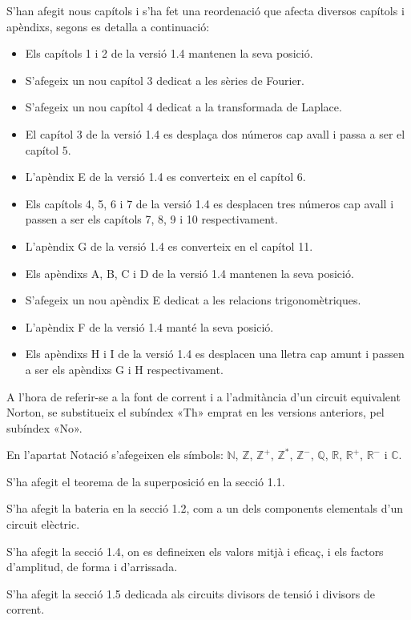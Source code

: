 S'han afegit nous capítols i s'ha fet una reordenació que afecta 
diversos capítols i apèndixs, segons es detalla a continuació:
\begin{itemize}
   \item Els capítols 1 i 2  de la versió 1.4 mantenen la seva posició.
   \item S'afegeix un nou capítol 3 dedicat a les sèries de Fourier.
   \item S'afegeix un nou capítol 4 dedicat a la transformada de Laplace.
   \item El capítol 3 de la versió 1.4 es desplaça dos números cap
    avall i passa a ser el capítol 5.
   \item L'apèndix E de la versió 1.4 es converteix en el capítol 6.
   \item Els capítols 4, 5, 6 i 7  de la versió 1.4 es desplacen tres números cap
    avall i passen a ser els capítols 7, 8, 9 i 10 respectivament.
    \item L'apèndix G de la versió 1.4 es converteix en el capítol 11.
    \item Els apèndixs A, B, C i D de la versió 1.4 mantenen la seva posició.
    \item S'afegeix un nou apèndix E dedicat a les relacions trigonomètriques.
    \item L'apèndix F de la versió 1.4 manté la seva posició.
    \item Els apèndixs H i I de la versió 1.4 es desplacen una lletra cap
    amunt i passen a ser els apèndixs G i H respectivament.
\end{itemize}


 A l'hora de referir-se a la font de corrent i a l'admitància d'un circuit equivalent
 Norton, se substitueix el subíndex «Th» emprat en les versions
anteriors, pel subíndex «No».

En l'apartat Notació s'afegeixen els símbols: $\mathbb{N}$,
$\mathbb{Z}$, $\mathbb{Z}^+$,  $\mathbb{Z}^*$, $\mathbb{Z}^-$,
$\mathbb{Q}$, $\mathbb{R}$, $\mathbb{R}^+$, $\mathbb{R}^-$ i
$\mathbb{C}$.

S'ha afegit el teorema de la superposició en la secció 1.1.


S'ha afegit la bateria en la secció 1.2, com a un
dels components elementals d'un circuit elèctric.

S'ha afegit la secció 1.4, on es defineixen els
valors mitjà i eficaç, i els factors d'amplitud, de forma i
d'arrissada.

S'ha afegit la secció 1.5 dedicada als
circuits divisors de tensió i divisors de corrent.

